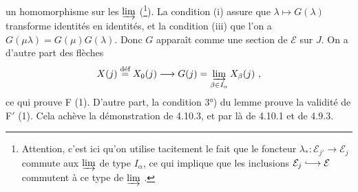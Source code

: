 
un homomorphisme sur les $\varinjlim$ (\footnote{Attention, c'est ici qu'on utilise tacitement le fait que le foncteur $\lambda_* : \mathcal{E}_{j'} \longrightarrow \mathcal{E}_j$ commute aux $\varinjlim$ de type $I_\alpha$, ce qui implique que les inclusions $\mathcal{E}_j \into \mathcal{E}$ commutent à ce type de $\varinjlim$ .}). La condition (i) assure que $\lambda \longmapsto G(\lambda)$ transforme identités en identités, et la condition (iii) que l'on a $G(\mu\lambda) = G(\mu)G(\lambda)$. Donc $G$ apparaît comme une section de $\mathcal{E}$ sur $J$. On a d'autre part des flèches
\[
X(j) \defeq X_0(j) \longrightarrow G(j) = \varinjlim_{\beta\in I_\alpha} X_\beta(j) \ ,
\]
ce qui prouve F (1). D'autre part, la condition 3°) du lemme prouve la validité de F$'$ (1). Cela achève la démonstration de 4.10.3, et par là de 4.10.1 et de 4.9.3.



